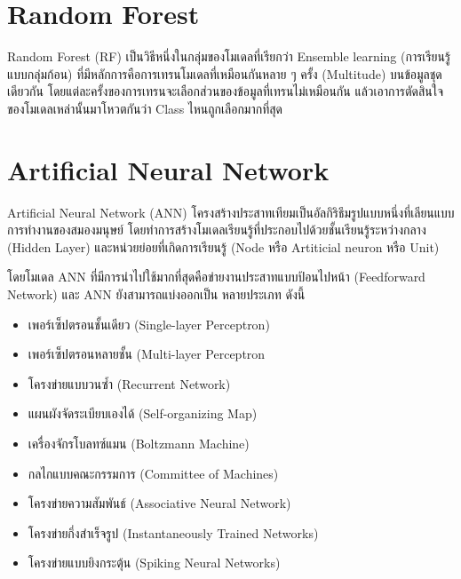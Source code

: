 \section{Random Forest}

Random Forest (RF) เป็นวิธีหนึ่งในกลุ่มของโมเดลที่เรียกว่า Ensemble learning (การเรียนรู้แบบกลุ่มก้อน) 
ที่มีหลักการคือการเทรนโมเดลที่เหมือนกันหลาย ๆ ครั้ง (Multitude) บนข้อมูลชุดเดียวกัน โดยแต่ละครั้งของการเทรนจะเลือกส่วนของข้อมูลที่เทรนไม่เหมือนกัน 
แล้วเอาการตัดสินใจของโมเดลเหล่านั้นมาโหวตกันว่า Class ไหนถูกเลือกมากที่สุด\cite{breiman2001,quinlan1986}

\section{Artificial Neural Network}

Artificial Neural Network (ANN) โครงสร้างประสาทเทียมเป็นอัลกิริธึมรูปแบบหนึ่งที่เลียนแบบการทำงานของสมองมนุษย์
โดยทำการสร้างโมเดลเรียนรู้ที่ประกอบไปด้วยชั้นเรียนรู้ระหว่างกลาง (Hidden Layer) และหน่วยย่อยที่เกิดการเรียนรู้ (Node หรือ Artiticial neuron หรือ Unit)

โดยโมเดล ANN ที่มีการนำไปใช้มากที่สุดคือข่ายงานประสาทแบบป้อนไปหน้า (Feedforward Network) และ ANN ยังสามารถแบ่งออกเป็น
หลายประเภท ดังนี้

\begin{itemize}
    \item เพอร์เซ็ปตรอนชั้นเดียว (Single-layer Perceptron)
    \item เพอร์เซ็ปตรอนหลายชั้น (Multi-layer Perceptron
    \item โครงข่ายแบบวนซ้ำ (Recurrent Network)
    \item แผนผังจัดระเบียบเองได้ (Self-organizing Map)
    \item เครื่องจักรโบลทซ์แมน (Boltzmann Machine)
    \item กลไกแบบคณะกรรมการ (Committee of Machines)
    \item โครงข่ายความสัมพันธ์ (Associative Neural Network)
    \item โครงข่ายกึ่งสำเร็จรูป (Instantaneously Trained Networks)
    \item โครงข่ายแบบยิงกระตุ้น (Spiking Neural Networks) 
\end{itemize}
